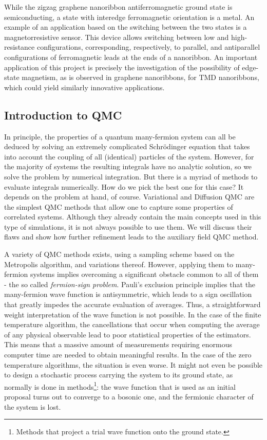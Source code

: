 While the zigzag graphene nanoribbon antiferromagnetic ground state is semiconducting, a state with interedge ferromagnetic orientation is a metal.
An example of an application based on the switching between the two states is a magnetorresistive sensor.
This device allows switching between low and high-resistance configurations, corresponding, respectively, to parallel, and antiparallel configurations of ferromagnetic leads at the ends of a nanoribbon.
An important application of this project is precisely the investigation of the possibility of edge-state magnetism, as is observed in graphene nanoribbons, for TMD nanoribbons, which could yield similarly innovative applications.


\subsection{Introduction to \acl{QMC}}

In principle, the properties of a quantum many-fermion system can all be deduced by solving an extremely complicated Schr\"odinger equation that takes into account the coupling of all (identical) particles of the system.
However, for the majority of systems the resulting integrals have no analytic solution, so we solve the problem by numerical integration.
But there is a myriad of methods to evaluate integrals numerically.
How do we pick the best one for this case? 
It depends on the problem at hand, of course.
Variational and Diffusion \ac{QMC} are the simplest \ac{QMC} methods that allow one to capture some properties of correlated systems.
Although they already contain the main concepts used in this type of simulations, it is not always possible to use them. 
We will discuss their flaws and show how further refinement leads to the auxiliary field \ac{QMC} method.

A variety of \acf{QMC} methods exists, using a sampling scheme based on the Metropolis algorithm, and variations thereof.
However, applying them to many-fermion systems implies overcoming a significant obstacle common to all of them - the so called \emph{fermion-sign problem}.
Pauli's exclusion principle implies that the many-fermion wave function is antisymmetric, which leads to a sign oscillation that greatly impedes the accurate evaluation of averages.
Thus, a straightforward weight interpretation of the wave function is not possible.
In the case of the finite temperature algorithm, the cancellations that occur when computing the average of any physical observable lead to poor statistical properties of the estimators.
This means that a massive amount of measurements requiring enormous computer time are needed to obtain meaningful results.
In the case of the zero temperature algorithms, the situation is even worse.
It might not even be possible to design a stochastic process carrying the system to its ground state, as normally is done in  methods\footnote{Methods that project a trial wave function onto the ground state.}: the wave function that is used as an initial proposal turns out to converge to a bosonic one, and the fermionic character of the system is lost.


